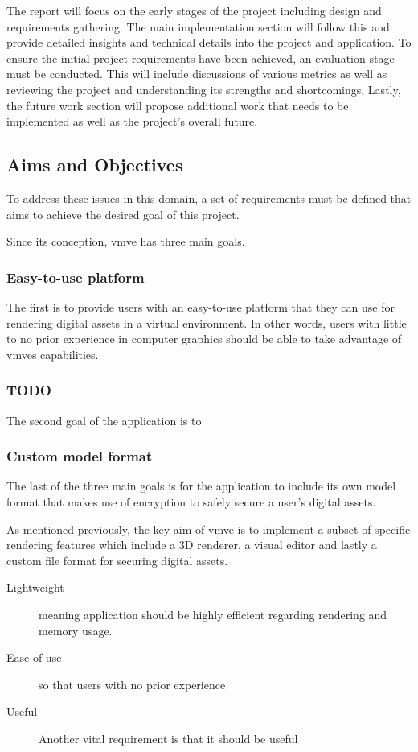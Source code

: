 \documentclass[11pt]{article}
\begin{document}
The report will focus on the early stages of the project including design and
requirements gathering. The main implementation section will follow this and
provide detailed insights and technical details into the project and
application. To ensure the initial project requirements have been achieved, an
evaluation stage must be conducted. This will include discussions of various
metrics as well as reviewing the project and understanding its strengths and
shortcomings. Lastly, the future work section will propose additional work that
needs to be implemented as well as the project's overall future.


\subsection{Aims and Objectives}
To address these issues in this domain, a set of requirements
must be defined that aims to achieve the desired goal of this project.

Since its conception, \gls{vmve} has three main goals. 

\subsubsection{Easy-to-use platform}
The first is to provide users with an easy-to-use platform that they can use for
rendering digital assets in a virtual environment. In other words, users with
little to no prior experience in computer graphics should be able to take
advantage of \glspl{vmve} capabilities.

\subsubsection{TODO}
The second goal of the application is to 

\subsubsection{Custom model format}
The last of the three main goals is for the application to include its own
model format that makes use of encryption to safely secure a user's digital
assets.

As mentioned previously, the key aim of \gls{vmve} is to implement a subset of 
specific rendering features which include a 3D renderer, a visual editor
and lastly a custom file format for securing digital assets.

\begin{description}
  \item[Lightweight] meaning application should be highly
    efficient regarding rendering and memory usage.
  \item[Ease of use] so that users with no prior experience
  \item[Useful]
    Another vital requirement is that it should be useful
\end{description}
  
\end{document}
